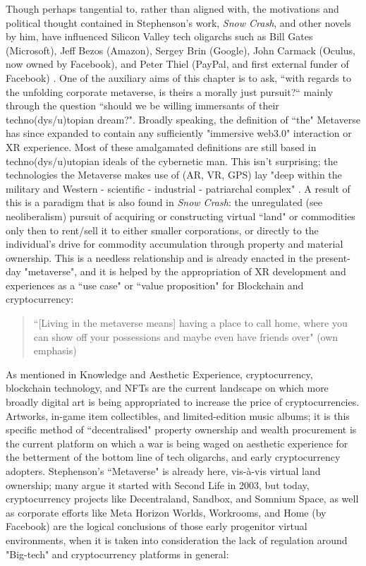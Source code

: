 Though perhaps tangential to, rather than aligned with, the motivations and political thought contained in Stephenson's work, \textit{Snow Crash}, and other novels by him, have influenced Silicon Valley tech oligarchs such as Bill Gates (Microsoft), Jeff Bezos (Amazon), Sergey Brin (Google), John Carmack (Oculus, now owned by Facebook), and Peter Thiel (PayPal, and first external funder of Facebook) \citep[]{rogers2021}. One of the auxiliary aims of this chapter is to ask, ``with regards to the unfolding corporate metaverse, is theirs a morally just pursuit?`` mainly through the question ``should we be willing immersants of their techno(dys/u)topian dream?". Broadly speaking, the definition of ``the" Metaverse has since expanded to contain any sufficiently "immersive web3.0" interaction or XR experience. Most of these amalgamated definitions are still based in techno(dys/u)utopian ideals of the cybernetic man. This isn't surprising; the technologies the Metaverse makes use of (AR, VR, GPS) lay "deep within the military and Western - scientific - industrial - patriarchal complex" \cite{davies2004}. A result of this is a paradigm that is also found in \textit{Snow Crash}: the unregulated (see neoliberalism) pursuit of acquiring or constructing virtual ``land" or commodities only then to rent/sell it to either smaller corporations, or directly to the individual's drive for commodity accumulation through property and material ownership. This is a needless relationship and is already enacted in the present-day "metaverse", and it is helped by the appropriation of XR development and experiences as a ``use case" or ``value proposition" for Blockchain and cryptocurrency:
\begin{quote}
    ``[Living in the metaverse means] having a place to call home, where you can show off your possessions and maybe even have friends over" (own emphasis) \citep[]{marr2022}
\end{quote}
As mentioned in Knowledge and Aesthetic Experience, cryptocurrency, blockchain technology, and NFTs are the current landscape on which more broadly digital art is being appropriated to increase the price of cryptocurrencies. Artworks, in-game item collectibles, and limited-edition music albums; it is this specific method of ``decentralised" property ownership and wealth procurement is the current platform on which a war is being waged on aesthetic experience for the betterment of the bottom line of tech oligarchs, and early cryptocurrency adopters. Stephenson's ``Metaverse" is already here, vis-à-vis virtual land ownership; many argue it started with Second Life in 2003, but today, cryptocurrency projects like Decentraland, Sandbox, and Somnium Space, as well as corporate efforts like Meta Horizon Worlds, Workrooms, and Home (by Facebook) are the logical conclusions of those early progenitor virtual environments, when it is taken into consideration the lack of regulation around "Big-tech" and cryptocurrency platforms in general:
